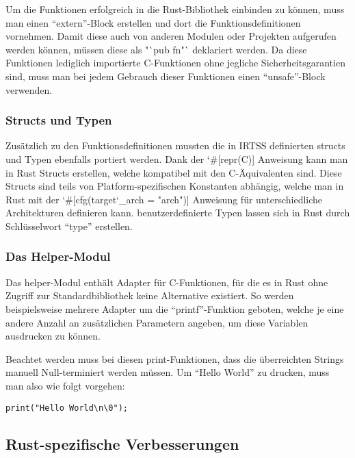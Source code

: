 Um die Funktionen erfolgreich in die Rust-Bibliothek einbinden zu können, muss man einen "`extern"'-Block erstellen und dort
die Funktionsdefinitionen vornehmen. Damit diese auch von anderen Modulen oder Projekten aufgerufen werden können, müssen diese
als "`pub fn"` deklariert werden. Da diese Funktionen lediglich importierte C-Funktionen ohne jegliche Sicherheitsgarantien
sind, muss man bei jedem Gebrauch dieser Funktionen einen "`unsafe"'-Block verwenden.

\subsubsection{Structs und Typen}

Zusätzlich zu den Funktionsdefinitionen mussten die in IRTSS definierten structs und Typen ebenfalls portiert werden.
Dank der \char`#[repr(C)] Anweisung kann man in Rust Structs erstellen, welche kompatibel mit den C-Äquivalenten sind.
Diese Structs sind teils von Platform-spezifischen Konstanten abhängig, welche man in Rust mit der
\char`#[cfg(target\char`_arch = "arch")] Anweisung für unterschiedliche Architekturen definieren kann.
benutzerdefinierte Typen lassen sich in Rust durch Schlüsselwort "`type"' erstellen.

\subsubsection{Das Helper-Modul}

Das helper-Modul enthält Adapter für C-Funktionen, für die es in Rust ohne Zugriff zur Standardbibliothek keine Alternative existiert.
So werden beispielsweise mehrere Adapter um die "`printf"'-Funktion geboten, welche je eine andere Anzahl an
zusätzlichen Parametern angeben, um diese Variablen ausdrucken zu können.

Beachtet werden muss bei diesen print-Funktionen, dass die überreichten Strings manuell Null-terminiert werden müssen. Um
"`Hello World"' zu drucken, muss man also wie folgt vorgehen:

\begin{verbatim}
print("Hello World\n\0");
\end{verbatim}

\subsection{Rust-spezifische Verbesserungen}


